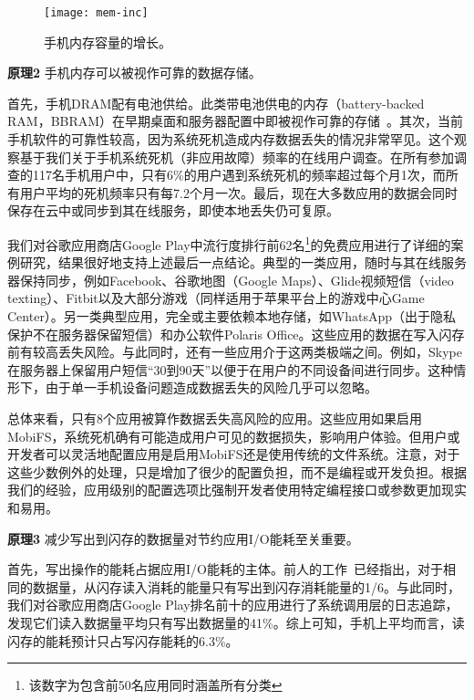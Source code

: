 \begin{figure}
  \centering
  \texttt{[image: mem-inc]}
  \caption{手机内存容量的增长。}
  \label{fig:mem-inc}
\end{figure}



\textbf{原理2} 手机内存可以被视作可靠的数据存储。

首先，手机DRAM配有电池供给。此类带电池供电的内存（battery-backed RAM，BBRAM）在早期桌面和服务器配置中即被视作可靠的存储~\cite{DeWitt:1984:ITM:602259.602261, Wang:2002:CBP:647057.713872, Wu:1994:ENM:195473.195506}。其次，当前手机软件的可靠性较高，因为系统死机造成内存数据丢失的情况非常罕见。这个观察基于我们关于手机系统死机（非应用故障）频率的在线用户调查。在所有参加调查的117名手机用户中，只有6\%的用户遇到系统死机的频率超过每个月1次，而所有用户平均的死机频率只有每7.2个月一次。最后，现在大多数应用的数据会同时保存在云中或同步到其在线服务，即使本地丢失仍可复原。

我们对谷歌应用商店Google Play中流行度排行前62名\footnote{该数字为包含前50名应用同时涵盖所有分类}的免费应用进行了详细的案例研究，结果很好地支持上述最后一点结论。典型的一类应用，随时与其在线服务器保持同步，例如Facebook、谷歌地图（Google Maps）、Glide视频短信（video texting）、Fitbit以及大部分游戏（同样适用于苹果平台上的游戏中心Game Center）。另一类典型应用，完全或主要依赖本地存储，如WhatsApp（出于隐私保护不在服务器保留短信）和办公软件Polaris Office。这些应用的数据在写入闪存前有较高丢失风险。与此同时，还有一些应用介于这两类极端之间。例如，Skype在服务器上保留用户短信“30到90天”以便于在用户的不同设备间进行同步。这种情形下，由于单一手机设备问题造成数据丢失的风险几乎可以忽略。

总体来看，只有8个应用被算作数据丢失高风险的应用。这些应用如果启用MobiFS，系统死机确有可能造成用户可见的数据损失，影响用户体验。但用户或开发者可以灵活地配置应用是启用MobiFS还是使用传统的文件系统。注意，对于这些少数例外的处理，只是增加了很少的配置负担，而不是编程或开发负担。根据我们的经验，应用级别的配置选项比强制开发者使用特定编程接口或参数更加现实和易用。

\textbf{原理3} 减少写出到闪存的数据量对节约应用I/O能耗至关重要。

首先，写出操作的能耗占据应用I/O能耗的主体。前人的工作~\cite{Carroll:2010:APC:1855840.1855861}已经指出，对于相同的数据量，从闪存读入消耗的能量只有写出到闪存消耗能量的1/6。与此同时，我们对谷歌应用商店Google Play排名前十的应用进行了系统调用层的日志追踪，发现它们读入数据量平均只有写出数据量的41\%。综上可知，手机上平均而言，读闪存的能耗预计只占写闪存能耗的6.3\%。

